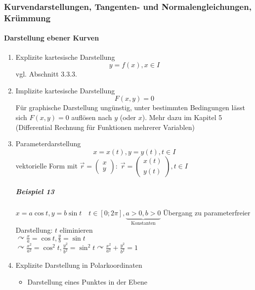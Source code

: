 \documentclass[a4paper]{scrartcl}
\begin{document}
\subsubsection{Kurvendarstellungen, Tangenten- und Normalengleichungen, Krümmung}
\paragraph{Darstellung ebener Kurven}
\begin{enumerate}
\item Explizite kartesische Darstellung 
\[y=f(x), x \in I\] vgl. Abschnitt 3.3.3.
\item Implizite kartesische Darstellung
\[F(x,y) =0 \]
Für graphische Darstellung ungünstig, unter bestimmten Bedingungen lässt sich $F(x,y) = 0$ auflösen nach $y$ (oder $x$). Mehr dazu im Kapitel 5 (Differential Rechnung für Funktionen mehrerer Variablen)
\item Parameterdarstellung
\[x=x(t), y=y(t), t \in I\]
vektorielle Form mit $\vec{r} = \begin{pmatrix} x \\y \end{pmatrix} : \; \vec{r} = \begin{pmatrix} x(t)\\y(t)\end{pmatrix}, t \in I$

\subparagraph{Beispiel 13}
$x = a \cos{t}, y=b \sin{t}\quad t \in [0;2\pi], \underbrace{a>0,b>0}_{\text{Konstanten}}$
Übergang zu parameterfreier Darstellung: $t$ eliminieren\\
$\curvearrowright \frac{x}{a} = \cos{t}, \frac{y}{b} = \sin{t}$\\
$\curvearrowright \frac{x^2}{a^2} = \cos^2{t}, \frac{y^2}{b^2} = \sin^2{t} \curvearrowright \frac{x^2}{a^2} + \frac{y^2}{b^2} = 1$

\item Explizite Darstellung in Polarkoordinaten
\begin{itemize}
\item Darstellung eines Punktes in der Ebene\\
\end{itemize}
\end{enumerate}
\end{document}
